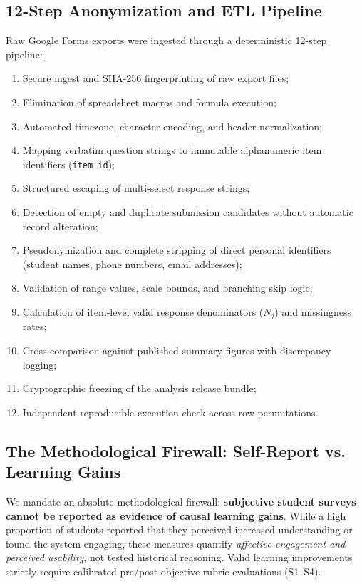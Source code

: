 \documentclass[journal]{IEEEtran}
\begin{document}
\subsection{12-Step Anonymization and ETL Pipeline}
Raw Google Forms exports were ingested through a deterministic 12-step pipeline:
\begin{enumerate}
    \item Secure ingest and SHA-256 fingerprinting of raw export files;
    \item Elimination of spreadsheet macros and formula execution;
    \item Automated timezone, character encoding, and header normalization;
    \item Mapping verbatim question strings to immutable alphanumeric item identifiers (\texttt{item\_id});
    \item Structured escaping of multi-select response strings;
    \item Detection of empty and duplicate submission candidates without automatic record alteration;
    \item Pseudonymization and complete stripping of direct personal identifiers (student names, phone numbers, email addresses);
    \item Validation of range values, scale bounds, and branching skip logic;
    \item Calculation of item-level valid response denominators ($N_j$) and missingness rates;
    \item Cross-comparison against published summary figures with discrepancy logging;
    \item Cryptographic freezing of the analysis release bundle;
    \item Independent reproducible execution check across row permutations.
\end{enumerate}

\subsection{The Methodological Firewall: Self-Report vs. Learning Gains}
We mandate an absolute methodological firewall: \textbf{subjective student surveys cannot be reported as evidence of causal learning gains}. While a high proportion of students reported that they perceived increased understanding or found the system engaging, these measures quantify \textit{affective engagement and perceived usability}, not tested historical reasoning. Valid learning improvements strictly require calibrated pre/post objective rubric evaluations (S1--S4).
\end{document}
